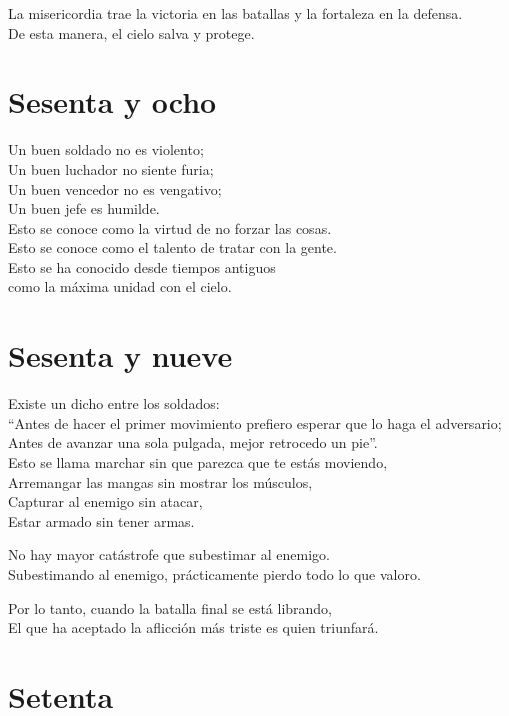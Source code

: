 \documentclass[book,b5paper,hidelinks,final]{memoir}
\begin{document}
	La misericordia trae la victoria en las batallas y la fortaleza en la
	defensa.\\
	De esta manera, el cielo salva y protege.
	
	\chapter*{Sesenta y ocho}
	
	Un buen soldado no es violento;\\
	Un buen luchador no siente furia;\\
	Un buen vencedor no es vengativo;\\
	Un buen jefe es humilde.\\
	Esto se conoce como la virtud de no forzar las cosas.\\
	Esto se conoce como el talento de tratar con la gente.\\
	Esto se ha conocido desde tiempos antiguos\\
	como la máxima unidad con el cielo.
	
	\chapter*{Sesenta y nueve}
	
	Existe un dicho entre los soldados:\\
	``Antes de hacer el primer movimiento prefiero esperar que lo haga el
	adversario;\\
	Antes de avanzar una sola pulgada, mejor retrocedo un pie''.\\
	Esto se llama marchar sin que parezca que te estás moviendo,\\
	Arremangar las mangas sin mostrar los músculos,\\
	Capturar al enemigo sin atacar,\\
	Estar armado sin tener armas.
	
	No hay mayor catástrofe que subestimar al enemigo.\\
	Subestimando al enemigo, prácticamente pierdo todo lo que valoro.
	
	Por lo tanto, cuando la batalla final se está librando,\\
	El que ha aceptado la aflicción más triste es quien triunfará.
	
	\chapter*{Setenta}
	
\end{document}
